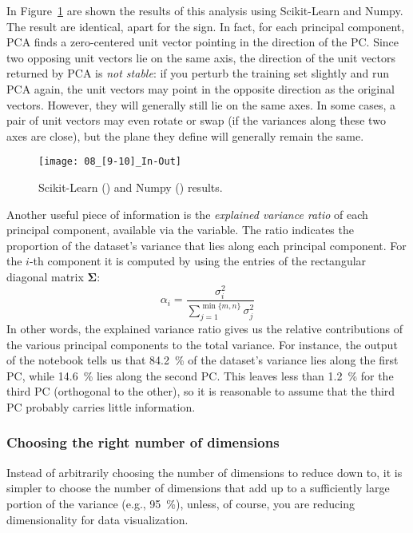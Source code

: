 In Figure~\ref{08_[9-10]_In-Out} are shown the results of this analysis using Scikit-Learn and Numpy. The result are identical, apart for the sign. In fact, for each principal component, PCA finds a zero-centered unit vector pointing in the direction of the PC. Since two opposing unit vectors lie on the same axis, the direction of the unit vectors returned by PCA is \emph{not stable}: if you perturb the training set slightly and run PCA again, the unit vectors may point in the opposite direction as the original vectors. However, they will generally still lie on the same axes. In some cases, a pair of unit vectors may even rotate or swap (if the variances along these two axes are close), but the plane they define will generally remain the same.
\begin{figure}[h!t]
\centering
\texttt{[image: 08\_[9-10]\_In-Out]}
\caption{Scikit-Learn () and Numpy () results.}\label{08_[9-10]_In-Out}
\end{figure}

Another useful piece of information is the \emph{explained variance ratio} of each principal component, available via the  variable. The ratio indicates the proportion of the dataset's variance that
lies along each principal component. For the $i$-th component it is computed by using the entries of the rectangular diagonal matrix $\boldsymbol{\Sigma}$:
\begin{equation}
\alpha_i=\frac{\sigma_i^2}{\sum_{j=1}^{\min{\{m,n\}}}\sigma_j^2}
\end{equation}
In other words, the explained variance ratio gives us the relative contributions of the various principal components to the total variance. For instance, the output of the notebook tells us that \SI{84.2}{\percent} of the dataset's variance lies along the first PC, while \SI{14.6}{\percent} lies along the second PC. This leaves less than \SI{1.2}{\percent} for the third PC (orthogonal to the other), so it is reasonable to assume that the third PC probably carries little information.
\subsubsection{Choosing the right number of dimensions}
Instead of arbitrarily choosing the number of dimensions to reduce down to, it is simpler to choose the number of dimensions that add up to a sufficiently large portion of the variance (e.g., \SI{95}{\percent}), unless, of course, you are reducing dimensionality for data visualization.

